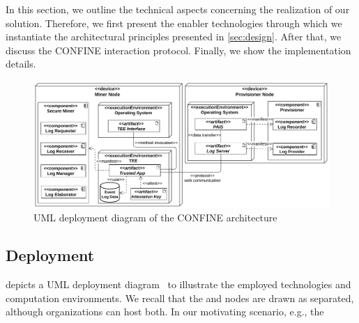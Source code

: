 In this section, we outline the technical aspects concerning the realization of our solution. Therefore, we first present the enabler technologies through which we instantiate the architectural principles presented in \cref{sec:design}. After that, we discuss the CONFINE interaction protocol. Finally, we show the implementation details.

%
\begin{figure}[t]
	\centering
	\includegraphics[width=1\linewidth]{content/figures/deploymentdiagram.pdf}
	\caption{UML deployment diagram of the CONFINE architecture}
	\label{fig:deployment_diagram}
\end{figure}
%
\subsection{Deployment}
\label{sec:deployment}
%
 depicts a UML deployment diagram~\citep{koch2002expressive} to illustrate the employed technologies and computation environments. %
We recall that the  and  nodes are drawn as separated, although organizations can host both. In our motivating scenario, e.g., the  %

